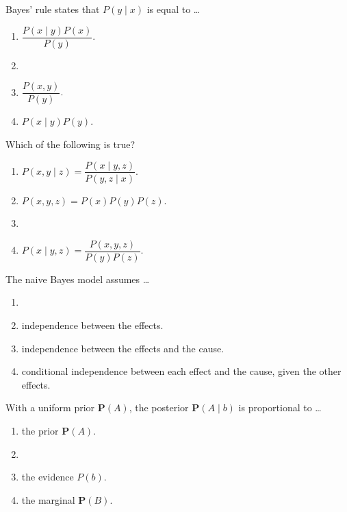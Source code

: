 \documentclass[11pt, a4paper]{exam}
\begin{document}
\begin{quiz}
    \item Bayes' rule states that $P(y \mid x)$ is equal to \ldots
    \begin{enumerate}[label=$\bigcirc$]
        \item $\dfrac{P(x \mid y) P(x)}{P(y)}$.
        \item {}
        \item $\dfrac{P(x, y)}{P(y)}$.
        \item $P(x \mid y) P(y)$.
    \end{enumerate}

    \item Which of the following is true?
    \begin{enumerate}[label=$\bigcirc$]
        \item $P(x, y \mid z) = \dfrac{P(x \mid y, z)}{P(y, z \mid x)}$.
        \item $P(x, y, z) = P(x) P(y) P(z)$.
        \item {}
        \item $P(x \mid y, z) = \dfrac{P(x, y, z)}{P(y) P(z)}$.
    \end{enumerate}

    \item The naive Bayes model assumes \ldots
    \begin{enumerate}[label=$\bigcirc$]
        \item {}
        \item independence between the effects.
        \item independence between the effects and the cause.
        \item conditional independence between each effect and the cause, given the other effects.
    \end{enumerate}

    \item With a uniform prior $\mathbf{P}(A)$, the posterior $\mathbf{P}(A \mid b)$ is proportional to \ldots
    \begin{enumerate}[label=$\bigcirc$]
        \item the prior $\mathbf{P}(A)$.
        \item {}
        \item the evidence $P(b)$.
        \item the marginal $\mathbf{P}(B)$.
    \end{enumerate}
\end{quiz}
\end{document}
